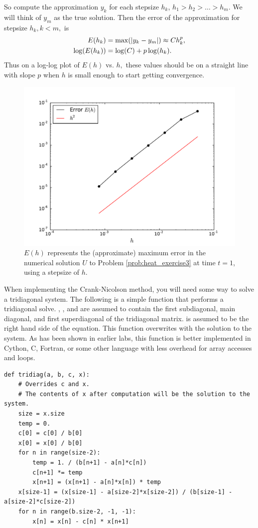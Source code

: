 So compute the approximation $y_k$ for each stepsize $h_k$, $h_1 > h_2> \ldots>h_m.$
We will think of $y_m$ as the true solution.
Then the error of the approximation for stepsize $h_k, k < m,$ is
\begin{align*}
	E(h_k) &= \max( \left\lvert y_k - y_m\right\rvert) \approx C h_k^p ,\\
	\log(E(h_k)) &= \log(C) + p \log(h_k).
\end{align*}
Thus on a log-log plot of $E(h)$ vs. $h,$ these values should be on a straight line with slope $p$ when $h$ is small enough to start getting convergence.

\begin{figure}
\centering
\includegraphics[width=\textwidth]{MaximumError.pdf}
\caption{$E(h)$ represents the (approximate) maximum error in the numerical solution $U$ to Problem \ref{prob:heat_exercise3} at time $t=1$, using a stepsize of $h$.}
\label{fig:heatexercise3}
\end{figure}

When implementing the Crank-Nicolson method, you will need some way to solve a tridiagonal system.
The following is a simple function that performs a tridiagonal solve.
, , and  are assumed to contain the first subdiagonal, main diagonal, and first superdiagonal of the tridiagonal matrix.
 is assumed to be the right hand side of the equation.
This function overwrites  with the solution to the system.
As has been shown in earlier labs, this function is better implemented in Cython, C, Fortran, or some other language with less overhead for array accesses and loops.
\begin{lstlisting}
def tridiag(a, b, c, x):
    # Overrides c and x.
    # The contents of x after computation will be the solution to the system.
    size = x.size
    temp = 0.
    c[0] = c[0] / b[0]
    x[0] = x[0] / b[0]
    for n in range(size-2):
        temp = 1. / (b[n+1] - a[n]*c[n])
        c[n+1] *= temp
        x[n+1] = (x[n+1] - a[n]*x[n]) * temp
    x[size-1] = (x[size-1] - a[size-2]*x[size-2]) / (b[size-1] - a[size-2]*c[size-2])
    for n in range(b.size-2, -1, -1):
        x[n] = x[n] - c[n] * x[n+1]
\end{lstlisting}

